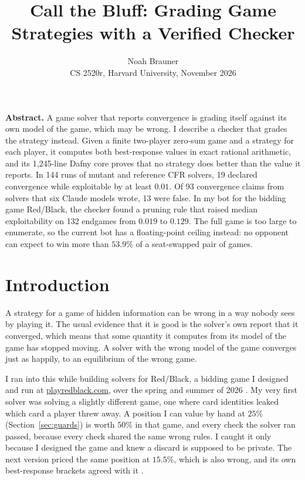\documentclass[11pt]{article}
\title{\vspace{-2.2em}\Large\textbf{Call the Bluff: Grading Game Strategies with a Verified Checker}}
\author{Noah Brauner\\\small CS 2520r, Harvard University, November 2026}
\date{}
\newcommand{\servedwin}{53.9\%}        %
\begin{document}
\maketitle
\vspace{-2.1em}

{\small\noindent\textbf{Abstract.} A game solver that reports convergence is grading itself against its own model of the
game, which may be wrong. I describe a checker that grades the strategy instead. Given a finite two-player
zero-sum game and a strategy for each player, it computes both best-response values in exact
rational arithmetic, and its 1,245-line Dafny core proves that no strategy does better than the
value it reports. In 144 runs of mutant and reference CFR solvers, 19 declared convergence while exploitable
by at least $0.01$. Of 93 convergence claims from solvers that six Claude models wrote, 13 were
false. In my bot for the bidding game Red/Black, the checker found a pruning rule that
raised median exploitability on 132 endgames from $0.019$ to $0.129$. The full game is too large to
enumerate, so the current bot has a floating-point ceiling instead: no opponent can expect to
win more than $\servedwin$ of a seat-swapped pair of games.
\par}

\section{Introduction}

A strategy for a game of hidden information can be wrong in a way nobody sees by playing it. The
usual evidence that it is good is the solver's own report that it converged, which means that some
quantity it computes from its model of the game has stopped moving. A solver with the wrong model of the game converges
just as happily, to an equilibrium of the wrong game.

I ran into this while building solvers for Red/Black, a bidding game I designed and run at
\href{https://www.playredblack.com}{playredblack.com}, over the spring and summer of 2026
\cite{rb0,rb1,rb2,rb3}. My very first solver was solving a slightly different game, one where card
identities leaked which card a player threw away. A position I can value by hand at $25\%$
(Section~\ref{sec:guards}) is worth $50\%$ in that game, and every check the solver ran passed,
because every check shared the same wrong rules. I caught it only because I designed the game and
knew a discard is supposed to be private. %
The next version priced the same position at $15.5\%$, which is also wrong, and its own
best-response brackets agreed with it \cite{rb2}.
\end{document}
